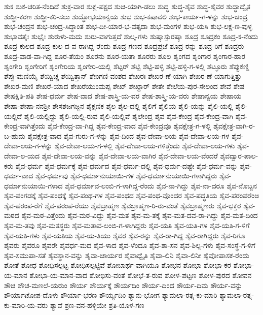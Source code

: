ಶುಕ
ಶುಕ-ಚರಿತ-ನೆಂದಿದೆ
ಶುಕ್ರ-ವಾರ
ಶುಕ್ಲ-ಪಕ್ಷದ
ಶುಚಿ-ಯಾಗಿ-ಡಲು
ಶುದ್ಧ
ಶುದ್ಧ-ಶೈವ
ಶುದ್ಧ-ಶೈವರ
ಶುದ್ಧಾದ್ವೈತ
ಶುದ್ಧೀ-ಕರಣ
ಶುದ್ಧೀ-ಕರಿ-ಸಲು
ಶುದ್ಧೋಭಯಾನ್ವಯ
ಶುಭ
ಶುಭ-ಕಷಾವಲಿ
ಶುಭ-ಕಾರ್ಯ-ಗ-ಳನ್ನು
ಶುಭ-ಚಂದ್ರ
ಶುಭ-ಚಂದ್ರನ
ಶುಭ-ಚಂದ್ರ-ಸಿದ್ಧಾಂತ
ಶುಭ-ದೀ-ಯಾರ-ಭ-ವತ್ಸದಾ
ಶುಭ-ಮಂಗಳ
ಶುಭ-ಯಸಿ
ಶುಭ-ಲಕ್ಷ-ಣ-ವುಳ್ಳ
ಶುಭಾವತೈಃ
ಶುಭೈಃ
ಶುರುಳು-ಮದು
ಶುರು-ವಾಗುತ್ತದೆ
ಶುಲ್ಕ-ಗಳು
ಶುಷ್ಕಾಸ್ತುರಷ್ಕಾ
ಶೂದ್ರ
ಶೂದ್ರಕಂ
ಶೂದ್ರ-ಕ-ನೆಂದು
ಶೂದ್ರ-ಕುಲದ
ಶೂದ್ರ-ಕುಲ-ದ-ವ-ರಾಗಿದ್ದ-ರೆಂದು
ಶೂದ್ರ-ಗಣದ
ಶೂದ್ರಪ್ರಜೆ
ಶೂದ್ರ-ರನ್ನು
ಶೂದ್ರ-ರಿಗೆ
ಶೂದ್ರರು
ಶೂದ್ರ-ವಾಡ-ವಾ-ಗಿದ್ದ
ಶೂರ-ತೆಯಂ
ಶೂರನು
ಶೂರ-ಯತಾ
ಶೂರರು
ಶೂಲ
ಶೃಂಗದ
ಶೃಂಗಾರ
ಶೃಂಗಾರ-ಹಾರ
ಶೃಂಗೇರಿ
ಶೃಂಗೇರಿಗೆ
ಶೃಂಗೇರಿಯ
ಶೃಂಗೇರಿ-ಯಲ್ಲಿ
ಶೆಟ್ಟರ್
ಶೆಟ್ಟಿ
ಶೆಟ್ಟಿ-ಹಳ್ಳಿ
ಶೆಟ್ಟಿ-ಹಳ್ಳಿ-ಗ-ಳಲ್ಲಿ
ಶೆಟ್ಳೂರು
ಶೆಪ್ಪುಕೆಣ್ಡಿ
ಶೆಪ್ಪು-ಮಣಿಯೈ
ಶೆಯ್ವಿಚ್ಚ
ಶೆಯ್ವಿತ್ತಾನ್
ಶೇಂಗಣಿ-ವಂಶದ
ಶೇಖರಃ
ಶೇಖರ-ಣೆ-ಯಾಗಿ
ಶೇಖರ-ಣೆ-ಯಾಗುತ್ತಿತ್ತು
ಶೇಖರ-ಮಣಿ
ಶೇಖರೆ-ಯಾದ
ಶೇಖರೆಯುಂಮಪ್ಪ
ಶೇಖ್
ಶೇಖ್ದಾರ್
ಶೇತೇ
ಶೇಲೆಯ-ಪುರ-ಸೇಲಂದ
ಶೇವೆ
ಶೇಷ
ಶೇಷಕ್ಷಿತಿ-ಪತಿ
ಶೇಷ-ಧರ್ಮ
ಶೇಷ-ವಾದ
ಶೇಷ-ಶಾಸ್ತ್ರಿ-ಯ-ವರ
ಶೇಷ-ಶಾಸ್ತ್ರಿ-ಯ-ವರು
ಶೇಷಾನ್ವಯ
ಶೇಷಾಯ
ಶೇಷಾ-ಶೇಷಾ-ನನಶ್ರೀ
ಶೇಸಶಜಗಜ್ಜನ
ಶೈಕ್ಷಣಿಕ
ಶೈಲ
ಶೈಲ-ದಲ್ಲಿ
ಶೈಲಿಗೆ
ಶೈಲಿಯ
ಶೈಲಿ-ಯನ್ನು
ಶೈಲಿ-ಯಲ್ಲಿ
ಶೈಲಿ-ಯಲ್ಲಿದೆ
ಶೈಲಿ-ಯಲ್ಲಿದ್ದು
ಶೈಲಿ-ಯಲ್ಲಿ-ರುವ
ಶೈಲಿ-ಯಲ್ಲಿವೆ
ಶೈಲೇಂದ್ರ
ಶೈವ
ಶೈವ-ಕೇಂದ್ರ
ಶೈವ-ಕೇಂದ್ರ-ವಾಗಿ
ಶೈವ-ಕೇಂದ್ರ-ವಾಗಿತ್ತೆಂದು
ಶೈವ-ಕೇಂದ್ರ-ವಾ-ಗಿದ್ದ
ಶೈವ-ಕೇಂದ್ರ-ವಾದ
ಶೈವ-ಕೇಂದ್ರವೂ
ಶೈವಕ್ಷೇತ್ರ-ಗ-ಳಲ್ಲಿ
ಶೈವಕ್ಷೇತ್ರ-ವಾಗಿ-ರ-ಬ-ಹುದು
ಶೈವಕ್ಷೇತ್ರ-ವಾದ
ಶೈವ-ಗುರು-ಗ-ಳನ್ನು
ಶೈವ-ದಿಂದ
ಶೈವ-ದೇವಾ-ಲಯ
ಶೈವ-ದೇವಾ-ಲಯ-ಗಳ
ಶೈವ-ದೇವಾ-ಲಯ-ಗ-ಳನ್ನು
ಶೈವ-ದೇವಾ-ಲಯ-ಗ-ಳಲ್ಲಿ
ಶೈವ-ದೇವಾ-ಲಯ-ಗಳಿತ್ತೆಂದು
ಶೈವ-ದೇವಾ-ಲಯ-ಗಳು
ಶೈವ-ದೇವಾ-ಲ-ಯದ
ಶೈವ-ದೇವಾ-ಲಯ-ವನ್ನು
ಶೈವ-ದೇವಾ-ಲಯ-ವಾಗಿರ
ಶೈವ-ದೇವಾ-ಲಯ-ವೆಂದರೆ
ಶೈವದ್ವಾರ-ಪಾಲ-ಕರು
ಶೈವ-ಧರ್ಮ
ಶೈವ-ಧರ್ಮಕ್ಕೆ
ಶೈವ-ಧರ್ಮದ
ಶೈವ-ಧರ್ಮ-ದಲ್ಲಿ
ಶೈವ-ಧರ್ಮ-ದಷ್ಟೇ
ಶೈವ-ಧರ್ಮ-ವನ್ನು
ಶೈವ-ಧರ್ಮ-ವಾದ
ಶೈವ-ಧರ್ಮವು
ಶೈವ-ಧರ್ಮಾನುಯಾಯಿ-ಗಳ
ಶೈವ-ಧರ್ಮಾನುಯಾಯಿ-ಗಳಾಗಿದ್ದರು
ಶೈವ-ಧರ್ಮಾನುಯಾಯಿ-ಗಳಾದ
ಶೈವ-ಧರ್ಮಾವ-ಲಂಬಿ-ಗ-ಳಾಗಿದ್ದ-ರೆಂದು
ಶೈವ-ನಾ-ಗಿದ್ದು
ಶೈವ-ನಾ-ದರೂ
ಶೈವ-ನೊಬ್ಬನ
ಶೈವ-ಪಂಗಡಕ್ಕೆ
ಶೈವ-ಪಂಥಕ್ಕೆ
ಶೈವ-ಪಂಥ-ಗಳ
ಶೈವ-ಪಂಥದ
ಶೈವ-ಪಂಥ-ವೊಂದರ
ಶೈವ-ಪದ್ಧತಿಯ
ಶೈವ-ಪರಂಪರೆಂಅ
ಶೈವ-ಪರಂಪ-ರೆಗೆ
ಶೈವ-ಪರಂಪ-ರೆಯು
ಶೈವಬ್ರಾಹ್ಮಣ
ಶೈವಬ್ರಾಹ್ಮಣ-ರಿ-ರು-ವಂತೆ
ಶೈವಬ್ರಾಹ್ಮಣರು
ಶೈವ-ಭಕ್ತರ
ಶೈವ-ಮಠದ
ಶೈವ-ಮಠ-ವಿತ್ತೆಂದು
ಶೈವ-ಮಠ-ವಿದ್ದು
ಶೈವ-ಮತ
ಶೈವ-ಮ-ತಕ್ಕೆ
ಶೈವ-ಮತ-ದವ-ರಾ-ಗಿದ್ದು
ಶೈವ-ಮತ-ದಿಂದ
ಶೈವ-ಮ-ತವು
ಶೈವ-ಮತಸ್ಥರು
ಶೈವ-ಮತಾವ-ಲಂಬಿ-ಗ-ಳಾಗಿದ್ದರು
ಶೈವ-ಯತಿ
ಶೈವ-ಯತಿ-ಗಳ
ಶೈವ-ಯತಿ-ಗ-ಳಿಗೆ
ಶೈವ-ಯತಿ-ಗಳು
ಶೈವ-ಯತಿಯ
ಶೈವ-ಯ-ತಿಯು
ಶೈವರ
ಶೈವ-ರನ್ನು
ಶೈವ-ರಾ-ಗಿದ್ದ
ಶೈವ-ರಾಗಿದ್ದರು
ಶೈವ-ರಿಗೂ
ಶೈವರು
ಶೈವರೂ
ಶೈವರೇ
ಶೈವರ್ಧ-ಮದ
ಶೈವ-ಳಾದ
ಶೈವ-ಳೆಂದೂ
ಶೈವ-ಶಾ-ಸನ
ಶೈವ-ಶಿಲ್ಪ-ಗಳು
ಶೈವ-ಸಂಸ್ಥೆ-ಗ-ಳಿಗೆ
ಶೈವ-ಸಮುಪಾ-ಸತೆ
ಶೈವಸ್ಥಾನ-ವನ್ನು
ಶೈವಾ-ಚಾರ್ಯರ
ಶೈವಾಧ್ವೈತಿ
ಶೈವಾ-ಲಿನಿ
ಶೈವಾ-ಲಿನೀ
ಶೈವೋಪಾಸಕ-ರೆಂದು
ಶೋತೆ
ಶೋಧ
ಶೋಧಿಸಲ್ಪಟ್ಟ
ಶೋಧಿಸಲ್ಪಟ್ಟಿವೆ
ಶೋಬಾರ್ಥ-ವಾಗಿಯೂ
ಶೋಭನ
ಶೋಭಾ
ಶೋಭಾ-ಕರ
ಶೋಭಾ-ಯ-ಮಾನ
ಶೋಭಾ-ಯ-ಮಾನ-ವಾದ
ಶೋಭಿಸು-ವಂತೆ
ಶೋಭೆ-ತ-ರುವ
ಶೋಳ-ಪಟ್ಟಣ
ಶೋಳ-ಪುರದ
ಶೋವನ
ಶೌಚ
ಶೌಚ-ಮಣಲೆ-ಯರುಂ
ಶೌರ್ಯ
ಶೌರ್ಯಕ್ಕೆ
ಶೌರ್ಯದಿಂ
ಶೌರ್ಯ-ದಿಂದ
ಶೌರ್ಯ-ದಿಮ
ಶೌರ್ಯ-ವನ್ನು
ಶೌರ್ಯಾಟೋಪ-ದೊಳು
ಶೌರ್ಯಾ-ಭರಣ
ಶೌರ್ಯ್ಯದಿಂ
ಶ್ಯಾನು-ಭೋಗ
ಶ್ಯಾಮಲಾ-ರತ್ನ-ಕು-ಮಾರಿ
ಶ್ಯಾಮಲಾ-ರತ್ನ-ಕು-ಮಾರಿ-ಯ-ವರು
ಶ್ಯಾವೆ
ಶ್ರಣ-ವನ-ಹಳ್ಳಿಯೇ
ಶ್ರತಿ-ಯೊಳ-ಗಣ
